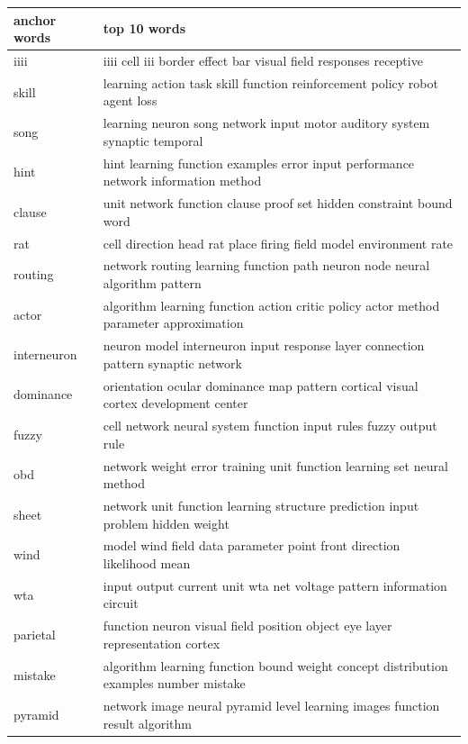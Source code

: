 \documentclass{article}
\begin{document}
  \begin{tabular}{ l | l }
    \hline
    \bf{anchor words} & \bf{top 10 words}\\ \hline
    iiii & iiii cell iii border effect bar visual field responses receptive \\ \hline 
    skill & learning action task skill function reinforcement policy robot agent loss \\ \hline 
    song & learning neuron song network input motor auditory system synaptic temporal \\ \hline 
    hint & hint learning function examples error input performance network information method \\ \hline 
    clause & unit network function clause proof set hidden constraint bound word \\ \hline 
    rat & cell direction head rat place firing field model environment rate \\ \hline 
    routing & network routing learning function path neuron node neural algorithm pattern \\ \hline 
    actor & algorithm learning function action critic policy actor method parameter approximation \\ \hline 
    interneuron & neuron model interneuron input response layer connection pattern synaptic network \\ \hline 
    dominance & orientation ocular dominance map pattern cortical visual cortex development center \\ \hline 
    fuzzy & cell network neural system function input rules fuzzy output rule \\ \hline 
    obd & network weight error training unit function learning set neural method \\ \hline 
    sheet & network unit function learning structure prediction input problem hidden weight \\ \hline 
    wind & model wind field data parameter point front direction likelihood mean \\ \hline 
    wta & input output current unit wta net voltage pattern information circuit \\ \hline 
    parietal & function neuron visual field position object eye layer representation cortex \\ \hline 
    mistake & algorithm learning function bound weight concept distribution examples number mistake \\ \hline 
    pyramid & network image neural pyramid level learning images function result algorithm \\ \hline 

\end{tabular}
\end{document}
